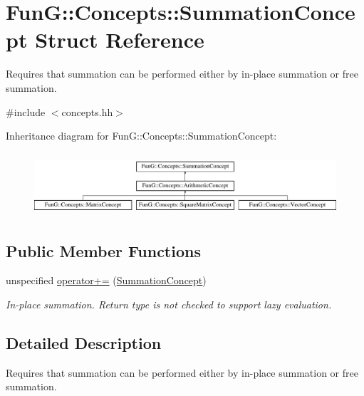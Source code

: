 \hypertarget{structFunG_1_1Concepts_1_1SummationConcept}{\section{\-Fun\-G\-:\-:\-Concepts\-:\-:\-Summation\-Concept \-Struct \-Reference}
\label{structFunG_1_1Concepts_1_1SummationConcept}
}


\-Requires that summation can be performed either by in-\/place summation or free summation.  




{\ttfamily \#include $<$concepts.\-hh$>$}

\-Inheritance diagram for \-Fun\-G\-:\-:\-Concepts\-:\-:\-Summation\-Concept\-:\begin{figure}[H]
\begin{center}
\leavevmode
\includegraphics[height=2.352941cm]{structFunG_1_1Concepts_1_1SummationConcept}
\end{center}
\end{figure}
\subsection*{\-Public \-Member \-Functions}
\begin{DoxyCompactItemize}
\item 
unspecified \hyperlink{structFunG_1_1Concepts_1_1SummationConcept_aa8214ca88fddf74e3bc9e7dbfe2b606f}{operator+=} (\hyperlink{structFunG_1_1Concepts_1_1SummationConcept}{\-Summation\-Concept})
\begin{DoxyCompactList}\small\item\em \-In-\/place summation. \-Return type is not checked to support lazy evaluation. \end{DoxyCompactList}\end{DoxyCompactItemize}


\subsection{\-Detailed \-Description}
\-Requires that summation can be performed either by in-\/place summation or free summation. 

